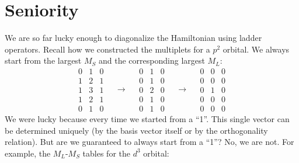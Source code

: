 \section{Seniority}
We are so far lucky enough to diagonalize the Hamiltonian using ladder operators.
Recall how we constructed the multiplets for a $p^2$ orbital. We always start from
the largest $M_S$ and the corresponding largest $M_L$:
\begin{equation*}
\begin{matrix}
0 & 1 & 0 \\
1 & 2 & \boxed{1} \\
1 & 3 & 1 \\
1 & 2 & 1 \\
0 & 1 & 0
\end{matrix}
\quad \rightarrow \quad
\begin{matrix}
0 & \boxed{1} & 0 \\
0 & 1 & 0 \\
0 & 2 & 0 \\
0 & 1 & 0 \\
0 & 1 & 0
\end{matrix}
\quad \rightarrow \quad
\begin{matrix}
0 & 0 & 0 \\
0 & 0 & 0 \\
0 & \boxed{1} & 0 \\
0 & 0 & 0 \\
0 & 0 & 0
\end{matrix}
\end{equation*}
%
We were lucky because every time we started from a ``1''. This single vector
can be determined uniquely (by the basis vector itself or by the orthogonality relation).
But are we guaranteed to always start from a ``1''?
No, we are not. For example, the $M_L$-$M_S$ tables for the $d^3$ orbital:
